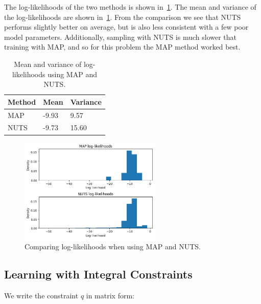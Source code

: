 The log-likelihoods of the two methods is shown in~\cref{gp:map_nuts_ll}.
The mean and variance of the log-likelihoods are shown in~\cref{gp:map_nuts_ll_mean_var}.
From the comparison we see that NUTS performs slightly better on average,
but is also less consistent with a few poor model parameters.
Additionally, sampling with NUTS is much slower that training with MAP,
and so for this problem the MAP method worked best.

\begin{table}[H]
  \centering
  \begin{tabular}{lll}
    \toprule
    Method & Mean  & Variance \\
    \midrule
    MAP    & -9.93 & 9.57     \\
    NUTS   & -9.73 & 15.60    \\
    \bottomrule
  \end{tabular}  
  \caption{
    Mean and variance of log-likelihoods using MAP and NUTS.
  }
  \label{gp:map_nuts_ll_mean_var}
\end{table}

\begin{figure}[htbp]
  \centering
  \includegraphics[width=0.6\textwidth]{./figures/map_nuts_ll.png}
  \caption{
    Comparing log-likelihoods when using MAP and NUTS.
  }
  \label{gp:map_nuts_ll}
\end{figure}

\subsection{Learning with Integral Constraints}

We write the constraint $\hat{q}$ in matrix form:

